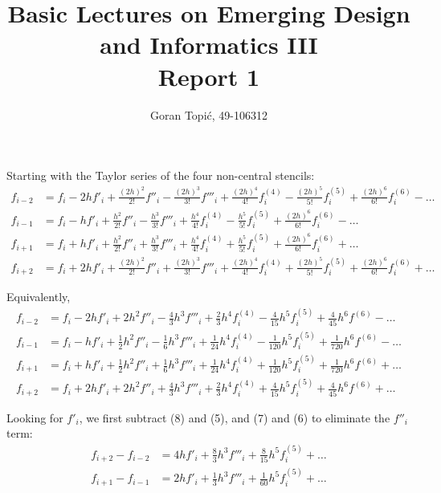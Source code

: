 \documentclass{article}
\begin{document}
\title{Basic Lectures on Emerging Design and Informatics III\\
Report 1}

\author{Goran Topi\'{c}, 49-106312}
\maketitle

Starting with the Taylor series of the four non-central stencils:
\begin{align}
  f_{i-2} &= f_i - 2h f'_i + \frac{(2h)^2}{2!} f''_i - \frac{(2h)^3}{3!} f'''_i + \frac{(2h)^4}{4!} f^{(4)}_i - \frac{(2h)^5}{5!} f^{(5)}_i + \frac{(2h)^6}{6!} f^{(6)}_i - \dots \\
  f_{i-1} &= f_i - h f'_i + \frac{h^2}{2!} f''_i - \frac{h^3}{3!} f'''_i + \frac{h^4}{4!} f^{(4)}_i - \frac{h^5}{5!} f^{(5)}_i + \frac{(2h)^6}{6!} f^{(6)}_i - \dots \\
  f_{i+1} &= f_i + h f'_i + \frac{h^2}{2!} f''_i + \frac{h^3}{3!} f'''_i + \frac{h^4}{4!} f^{(4)}_i + \frac{h^5}{5!} f^{(5)}_i + \frac{(2h)^6}{6!} f^{(6)}_i + \dots \\
  f_{i+2} &= f_i + 2h f'_i + \frac{(2h)^2}{2!} f''_i + \frac{(2h)^3}{3!} f'''_i + \frac{(2h)^4}{4!} f^{(4)}_i + \frac{(2h)^5}{5!} f^{(5)}_i + \frac{(2h)^6}{6!} f^{(6)}_i + \dots
\end{align}

Equivalently,
\begin{align}
  f_{i-2} &= f_i - 2h f'_i + 2h^2 f''_i - \frac{4}{3}h^3 f'''_i + \frac{2}{3}h^4 f^{(4)}_i - \frac{4}{15}h^5 f^{(5)}_i + \frac{4}{45}h^6 f^{(6)} - \dots \\
  f_{i-1} &= f_i - h f'_i + \frac{1}{2}h^2 f''_i - \frac{1}{6}h^3 f'''_i + \frac{1}{24}h^4 f^{(4)}_i - \frac{1}{120}h^5 f^{(5)}_i + \frac{1}{720}h^6 f^{(6)} - \dots \\
  f_{i+1} &= f_i + h f'_i + \frac{1}{2}h^2 f''_i + \frac{1}{6}h^3 f'''_i + \frac{1}{24}h^4 f^{(4)}_i + \frac{1}{120}h^5 f^{(5)}_i + \frac{1}{720}h^6 f^{(6)} + \dots \\
  f_{i+2} &= f_i + 2h f'_i + 2h^2 f''_i + \frac{4}{3}h^3 f'''_i + \frac{2}{3}h^4 f^{(4)}_i + \frac{4}{15}h^5 f^{(5)}_i + \frac{4}{45}h^6 f^{(6)} + \dots
\end{align}

Looking for $f'_i$, we first subtract (8) and (5), and (7) and (6) to eliminate the $f''_i$ term:
\begin{align}
  f_{i+2} - f_{i-2} &= 4hf'_i + \frac{8}{3}h^3 f'''_i + \frac{8}{15}h^5 f^{(5)}_i + \dots \\
  f_{i+1} - f_{i-1} &= 2hf'_i + \frac{1}{3}h^3 f'''_i + \frac{1}{60}h^5 f^{(5)}_i + \dots
\end{align}
\end{document}
